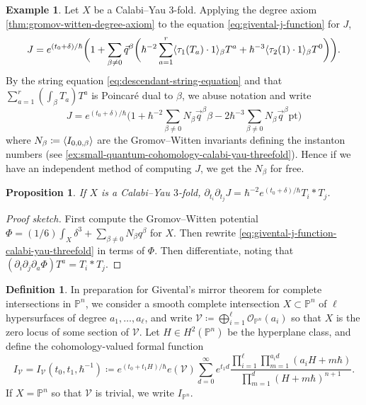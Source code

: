 \documentclass{report}
\theoremstyle{plain}
\newtheorem{proposition}[theorem]{Proposition}
\theoremstyle{definition}
\newtheorem{definition}[theorem]{Definition}
\newtheorem{example}[theorem]{Example}
\theoremstyle{remark}
\newcommand{\di}{\partial}
\newcommand{\bP}{\mathbb{P}}
\newcommand{\cO}{\mathcal{O}}
\newcommand{\cV}{\mathcal{V}}
\newcommand{\pt}{\mathrm{pt}}
\DeclarePairedDelimiter{\inner}{\langle}{\rangle}
\begin{document}
\begin{example}
  Let $X$ be a Calabi--Yau $3$-fold. Applying the degree axiom
  \ref{thm:gromov-witten-degree-axiom} to the equation
  \ref{eq:givental-j-function} for $J$,
  \begin{equation} \label{eq:givental-j-function-calabi-yau-threefold}
    J = e^{(t_0 + \delta)/\hbar} \bigg(1 + \sum_{\beta \neq 0} \vec q^\beta\bigg(\hbar^{-2}\sum_{a=1}^r \inner{\tau_1(T_a) \cdot 1}_\beta T^a + \hbar^{-3} \inner{\tau_2(1) \cdot 1}_\beta T^0\bigg)\bigg).
  \end{equation}
  By the string equation \eqref{eq:descendant-string-equation} and
  that $\sum_{a=1}^r (\int_\beta T_a) T^a$ is Poincar\'e dual to
  $\beta$, we abuse notation and write
  \[ J = e^{(t_0 + \delta)/\hbar} \bigg(1 + \hbar^{-2} \sum_{\beta \neq 0} N_\beta \vec q^\beta \beta - 2\hbar^{-3} \sum_{\beta \neq 0} N_\beta \vec q^\beta \pt\bigg) \]
  where $N_\beta \coloneqq \inner{I_{0,0,\beta}}$ are the
  Gromov--Witten invariants defining the instanton numbers (see
  \ref{ex:small-quantum-cohomology-calabi-yau-threefold}). Hence if we
  have an independent method of computing $J$, we get the $N_\beta$
  for free.
\end{example}

\begin{proposition} \cite[Proposition 10.3.4]{Cox1999} \label{thm:givental-j-function-calabi-yau-threefold}
  If $X$ is a Calabi--Yau $3$-fold, $\di_{t_i} \di_{t_j} J =
  \hbar^{-2} e^{(t_0+\delta)/\hbar} T_i * T_j$.
\end{proposition}

\begin{proof}[Proof sketch]
  First compute the Gromov--Witten potential $\Phi = (1/6)\int_X
  \delta^3 + \sum_{\beta \neq 0} N_\beta q^\beta$ for $X$. Then
  rewrite \eqref{eq:givental-j-function-calabi-yau-threefold} in terms
  of $\Phi$. Then differentiate, noting that $(\di_i \di_j \di_a \Phi)
  T^a = T_i * T_j$.
\end{proof}

\begin{definition}
  In preparation for Givental's mirror theorem for complete
  intersections in $\bP^n$, we consider a smooth complete intersection
  $X \subset \bP^n$ of $\ell$ hypersurfaces of degree $a_1, \ldots,
  a_\ell$, and write $\cV \coloneqq \bigoplus_{i=1}^\ell
  \cO_{\bP^n}(a_i)$ so that $X$ is the zero locus of some section of
  $\cV$. Let $H \in H^2(\bP^n)$ be the hyperplane class, and define
  the cohomology-valued formal function
  \begin{equation} \label{eq:givental-i-function}
    I_{\cV} = I_{\cV}(t_0, t_1, \hbar^{-1}) \coloneqq e^{(t_0 + t_1H)/\hbar} e(\cV) \sum_{d=0}^\infty e^{t_1d} \frac{\prod_{i=1}^\ell \prod_{m=1}^{a_i d} (a_i H + m\hbar)}{\prod_{m=1}^d (H + m\hbar)^{n+1}}.
  \end{equation}
  If $X = \bP^n$ so that $\cV$ is trivial, we write $I_{\bP^n}$.
\end{definition}
\end{document}
